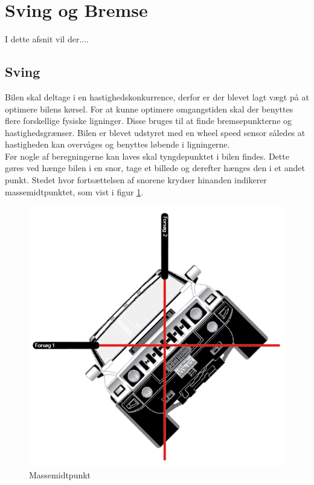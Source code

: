 \section{Sving og Bremse}
\label{sving_bremse}

I dette afsnit vil der.... 

\subsection{Sving}

Bilen skal deltage i en hastighedskonkurrence, derfor er der blevet lagt vægt på at optimere bilens kørsel. 
For at kunne optimere omgangstiden skal der benyttes flere forskellige fysiske ligninger. Disse bruges til at finde bremsepunkterne og hastighedsgrænser. Bilen er blevet udstyret med en wheel speed sensor således at hastigheden kan overvåges og benyttes løbende i ligningerne. \\

Før nogle af beregningerne kan laves skal tyngdepunktet i bilen findes. Dette gøres ved hænge bilen i en snor, tage et billede og derefter hænges den i et andet punkt. Stedet hvor fortsættelsen af snorene krydser hinanden indikerer massemidtpunktet, som vist i figur \ref{massemidtpunkt}. \\

\begin{figure}
\includegraphics[scale=0.5]{./Graphics/massemidtpunkt.png}
\caption{Massemidtpunkt}
\label{massemidtpunkt}
\end{figure}


